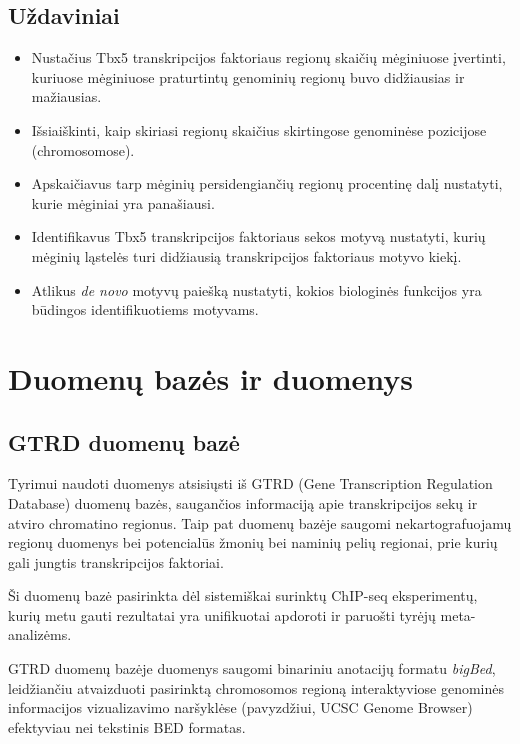 \documentclass[12pt]{article}
\begin{document}
\subsection*{Uždaviniai}
\begin{itemize}
    \item Nustačius Tbx5 transkripcijos faktoriaus regionų skaičių mėginiuose
    įvertinti, kuriuose mėginiuose praturtintų genominių regionų buvo
    didžiausias ir mažiausias.
    \item Išsiaiškinti, kaip skiriasi regionų skaičius skirtingose genominėse
    pozicijose (chromosomose).
    \item Apskaičiavus tarp mėginių persidengiančių regionų procentinę dalį
    nustatyti, kurie mėginiai yra panašiausi.
    \item Identifikavus Tbx5 transkripcijos faktoriaus sekos motyvą nustatyti,
    kurių mėginių ląstelės turi didžiausią transkripcijos faktoriaus motyvo
    kiekį.
    \item Atlikus \emph{de novo} motyvų paiešką nustatyti, kokios biologinės
    funkcijos yra būdingos identifikuotiems motyvams.
\end{itemize}

\newpage

\section{Duomenų bazės ir duomenys}
\subsection{GTRD duomenų bazė}
Tyrimui naudoti duomenys atsisiųsti iš GTRD (Gene Transcription Regulation
Database)\cite{GTRD} duomenų bazės, saugančios informaciją apie transkripcijos
sekų ir atviro chromatino regionus. Taip pat duomenų bazėje saugomi
nekartografuojamų regionų duomenys bei potencialūs žmonių bei naminių pelių
regionai, prie kurių gali jungtis transkripcijos faktoriai.

Ši duomenų bazė pasirinkta dėl sistemiškai surinktų ChIP-seq eksperimentų,
kurių metu gauti rezultatai yra unifikuotai apdoroti ir paruošti tyrėjų
meta-analizėms.

GTRD duomenų bazėje duomenys saugomi binariniu anotacijų formatu \emph{bigBed},
leidžiančiu atvaizduoti pasirinktą chromosomos regioną interaktyviose genominės
informacijos vizualizavimo naršyklėse (pavyzdžiui, UCSC Genome
Browser\cite{UCSCGB}) efektyviau nei tekstinis BED formatas.
\end{document}
